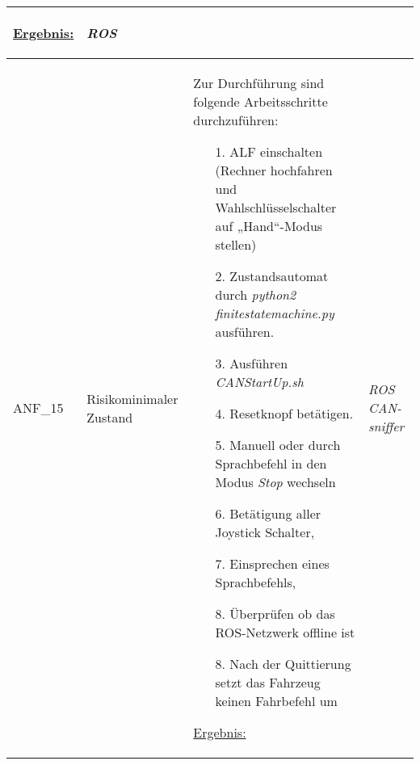 \documentclass[12pt,a4paper,oneside,numbers=noenddot,captions=tableheading,toc=bibliography,openany,tikz,margin=5mm]{scrbook}
\begin{document}
\begin{longtable}{|p{}|p{}|p{7cm}|p{}|}
\begin{itemize}
	\end{itemize}
	
	\underline{Ergebnis:}\newline
	\newline
	\textbf{}%
	& \textit{ROS}\newline
	\\
	\hline
		ANF\_15& Risikominimaler Zustand & Zur Durchführung sind folgende Arbeitsschritte durchzuführen:
	\begin{itemize}
		\item[1.]	ALF einschalten (Rechner hochfahren und Wahlschlüsselschalter auf „Hand“-Modus stellen)
		\item[2.]	Zustandsautomat durch \textit{python2 finitestatemachine.py} ausführen.
		\item[3.]	Ausführen \textit{CANStartUp.sh}
		\item[4.]	Resetknopf betätigen.
		\item[5.]	Manuell oder durch Sprachbefehl in den Modus \textit{Stop} wechseln
		\item[6.]	Betätigung aller Joystick Schalter,
		\item[7.]   Einsprechen eines Sprachbefehls, 
		\item[8.]	Überprüfen ob das ROS-Netzwerk offline ist
		\item[8.]	Nach der Quittierung setzt das Fahrzeug keinen Fahrbefehl um
	\end{itemize}
	
	\underline{Ergebnis:}\newline
	\newline
	\textbf{}%
	& \textit{ROS}\newline
	\textit{CAN-sniffer}
	\\
	\hline
\end{longtable} 
\end{document}
